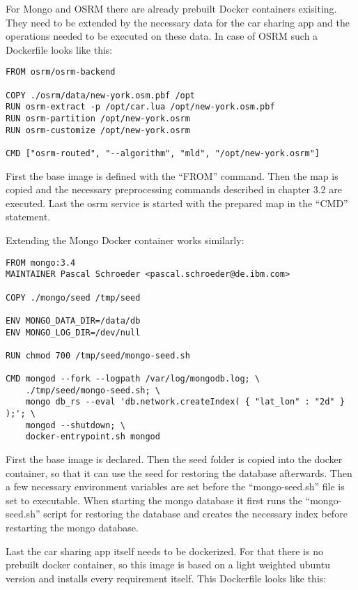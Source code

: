 For Mongo and OSRM there are already prebuilt Docker containers exisiting. They need to be extended by the necessary data for the car sharing app and the operations needed to be executed on these data. In case of OSRM such a Dockerfile looks like this:

\begin{lstlisting}
FROM osrm/osrm-backend

COPY ./osrm/data/new-york.osm.pbf /opt
RUN osrm-extract -p /opt/car.lua /opt/new-york.osm.pbf
RUN osrm-partition /opt/new-york.osrm
RUN osrm-customize /opt/new-york.osrm

CMD ["osrm-routed", "--algorithm", "mld", "/opt/new-york.osrm"]
\end{lstlisting}

First the base image is defined with the ``FROM'' command. Then the map is copied and the necessary preprocessing commands described in chapter 3.2 are executed. Last the osrm service is started with the prepared map in the ``CMD'' statement.

Extending the Mongo Docker container works similarly:

\begin{lstlisting}
FROM mongo:3.4
MAINTAINER Pascal Schroeder <pascal.schroeder@de.ibm.com>

COPY ./mongo/seed /tmp/seed

ENV MONGO_DATA_DIR=/data/db
ENV MONGO_LOG_DIR=/dev/null

RUN chmod 700 /tmp/seed/mongo-seed.sh

CMD mongod --fork --logpath /var/log/mongodb.log; \
    ./tmp/seed/mongo-seed.sh; \
    mongo db_rs --eval 'db.network.createIndex( { "lat_lon" : "2d" } );'; \
    mongod --shutdown; \
    docker-entrypoint.sh mongod
\end{lstlisting}

First the base image is declared. Then the seed folder is copied into the docker container, so that it can use the seed for restoring the database afterwards. Then a few necessary environment variables are set before the ``mongo-seed.sh'' file is set to executable. When starting the mongo database it first runs the ``mongo-seed.sh'' script for restoring the database and creates the necessary index before restarting the mongo database.

Last the car sharing app itself needs to be dockerized. For that there is no prebuilt docker container, so this image is based on a light weighted ubuntu version and installs every requirement itself. This Dockerfile looks like this:


